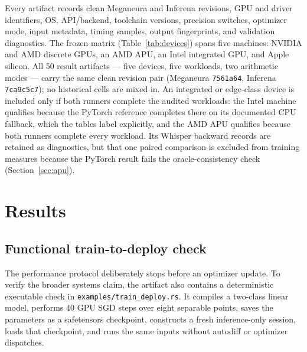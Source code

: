 \documentclass[10pt,twocolumn]{article}
\newcommand{\system}{Meganeura}
\newcommand{\inferena}{Inferena}
\newcommand{\code}[1]{\texttt{#1}}
\begin{document}
Every artifact records clean \system{} and \inferena{} revisions, GPU and
driver identifiers, OS, API/backend, toolchain versions, precision switches,
optimizer mode, input metadata, timing samples, output fingerprints, and
validation diagnostics. The frozen matrix (Table~\ref{tab:devices}) spans
five machines: NVIDIA and AMD discrete GPUs, an AMD APU, an Intel
integrated GPU, and Apple silicon. All 50 result artifacts --- five
devices, five workloads, two arithmetic modes --- carry the same clean
revision pair (\system{} \code{7561a64}, \inferena{} \code{7ca9c5c7}); no
historical cells are mixed in. An integrated or edge-class device is
included only if both runners complete the audited workloads: the Intel
machine qualifies because the PyTorch reference completes there on its
documented CPU fallback, which the tables label explicitly, and the AMD
APU qualifies because both runners complete every workload. Its Whisper
backward records are retained as diagnostics, but that one paired comparison
is excluded from training measures because the PyTorch result fails the
oracle-consistency check (Section~\ref{sec:apu}).

\begin{table}[t]
\centering
\footnotesize
\setlength{\tabcolsep}{3pt}

\caption{The frozen device matrix. Each PyTorch build is the newest vendor
wheel that functioned on that machine, which is why versions differ.
``Compiled'' means the measured series ran under \code{torch.compile};
``eager'' means the compiler was unavailable there (unsupported for MPS in
the harness; Inductor fell back on the Intel machine's CPU device). On the
Intel machine the \code{+xpu} wheel installs but exposes no usable XPU
device, so its reference executes on the CPU.}
\label{tab:devices}
\end{table}

\section{Results}
\label{sec:results}

\subsection{Functional train-to-deploy check}
\label{sec:train-deploy}

The performance protocol deliberately stops before an optimizer update. To
verify the broader systems claim, the artifact also contains a deterministic
executable check in \code{examples/train\_deploy.rs}. It compiles a two-class
linear model, performs 40 GPU SGD steps over eight separable points, saves the
parameters as a safetensors checkpoint, constructs a fresh inference-only
session, loads that checkpoint, and runs the same inputs without autodiff or
optimizer dispatches.
\end{document}
